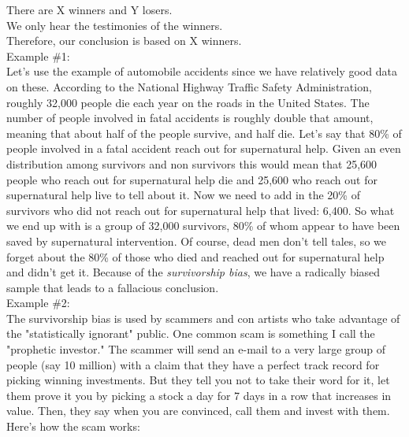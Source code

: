 \documentclass[a4paper,12pt,single,pdftex]{scrartcl}
\begin{document}
    
      There are X winners and Y losers.
    \\

    
      We only hear the testimonies of the winners.
    \\

    
      Therefore, our conclusion is based on X winners.
    \\

    
      Example \#1:
    \\

    
      Let's use the example of automobile accidents since we have relatively good data on these. According to the National Highway Traffic Safety Administration, roughly 32,000 people die each year on the roads in the United States. The number of people involved in fatal accidents is roughly double that amount, meaning that about half of the people survive, and half die. Let's say that 80\% of people involved in a fatal accident reach out for supernatural help. Given an even distribution among survivors and non survivors this would mean that 25,600 people who reach out for supernatural help die and 25,600 who reach out for supernatural help live to tell about it. Now we need to add in the 20\% of survivors who did not reach out for supernatural help that lived: 6,400. So what we end up with is a group of 32,000 survivors, 80\% of whom appear to have been saved by supernatural intervention. Of course, dead men don't tell tales, so we forget about the 80\% of those who died and reached out for supernatural help and didn't get it. Because of the {\it survivorship bias}, we have a radically biased sample that leads to a fallacious conclusion.
    \\

    
      Example \#2:
    \\

    
      The survivorship bias is used by scammers and con artists who take advantage of the "statistically ignorant" public. One common scam is something I call the "prophetic investor." The scammer will send an e-mail to a very large group of people (say 10 million) with a claim that they have a perfect track record for picking winning investments. But they tell you not to take their word for it, let them prove it you by picking a stock a day for 7 days in a row that increases in value. Then, they say when you are convinced, call them and invest with them. Here's how the scam works:
    \\
\end{document}
